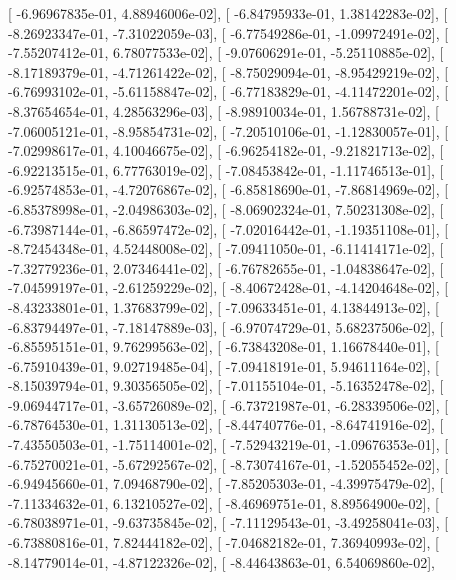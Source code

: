 \documentclass{article}
\begin{document}
       [ -6.96967835e-01,   4.88946006e-02],
       [ -6.84795933e-01,   1.38142283e-02],
       [ -8.26923347e-01,  -7.31022059e-03],
       [ -6.77549286e-01,  -1.09972491e-02],
       [ -7.55207412e-01,   6.78077533e-02],
       [ -9.07606291e-01,  -5.25110885e-02],
       [ -8.17189379e-01,  -4.71261422e-02],
       [ -8.75029094e-01,  -8.95429219e-02],
       [ -6.76993102e-01,  -5.61158847e-02],
       [ -6.77183829e-01,  -4.11472201e-02],
       [ -8.37654654e-01,   4.28563296e-03],
       [ -8.98910034e-01,   1.56788731e-02],
       [ -7.06005121e-01,  -8.95854731e-02],
       [ -7.20510106e-01,  -1.12830057e-01],
       [ -7.02998617e-01,   4.10046675e-02],
       [ -6.96254182e-01,  -9.21821713e-02],
       [ -6.92213515e-01,   6.77763019e-02],
       [ -7.08453842e-01,  -1.11746513e-01],
       [ -6.92574853e-01,  -4.72076867e-02],
       [ -6.85818690e-01,  -7.86814969e-02],
       [ -6.85378998e-01,  -2.04986303e-02],
       [ -8.06902324e-01,   7.50231308e-02],
       [ -6.73987144e-01,  -6.86597472e-02],
       [ -7.02016442e-01,  -1.19351108e-01],
       [ -8.72454348e-01,   4.52448008e-02],
       [ -7.09411050e-01,  -6.11414171e-02],
       [ -7.32779236e-01,   2.07346441e-02],
       [ -6.76782655e-01,  -1.04838647e-02],
       [ -7.04599197e-01,  -2.61259229e-02],
       [ -8.40672428e-01,  -4.14204648e-02],
       [ -8.43233801e-01,   1.37683799e-02],
       [ -7.09633451e-01,   4.13844913e-02],
       [ -6.83794497e-01,  -7.18147889e-03],
       [ -6.97074729e-01,   5.68237506e-02],
       [ -6.85595151e-01,   9.76299563e-02],
       [ -6.73843208e-01,   1.16678440e-01],
       [ -6.75910439e-01,   9.02719485e-04],
       [ -7.09418191e-01,   5.94611164e-02],
       [ -8.15039794e-01,   9.30356505e-02],
       [ -7.01155104e-01,  -5.16352478e-02],
       [ -9.06944717e-01,  -3.65726089e-02],
       [ -6.73721987e-01,  -6.28339506e-02],
       [ -6.78764530e-01,   1.31130513e-02],
       [ -8.44740776e-01,  -8.64741916e-02],
       [ -7.43550503e-01,  -1.75114001e-02],
       [ -7.52943219e-01,  -1.09676353e-01],
       [ -6.75270021e-01,  -5.67292567e-02],
       [ -8.73074167e-01,  -1.52055452e-02],
       [ -6.94945660e-01,   7.09468790e-02],
       [ -7.85205303e-01,  -4.39975479e-02],
       [ -7.11334632e-01,   6.13210527e-02],
       [ -8.46969751e-01,   8.89564900e-02],
       [ -6.78038971e-01,  -9.63735845e-02],
       [ -7.11129543e-01,  -3.49258041e-03],
       [ -6.73880816e-01,   7.82444182e-02],
       [ -7.04682182e-01,   7.36940993e-02],
       [ -8.14779014e-01,  -4.87122326e-02],
       [ -8.44643863e-01,   6.54069860e-02],
\end{document}
